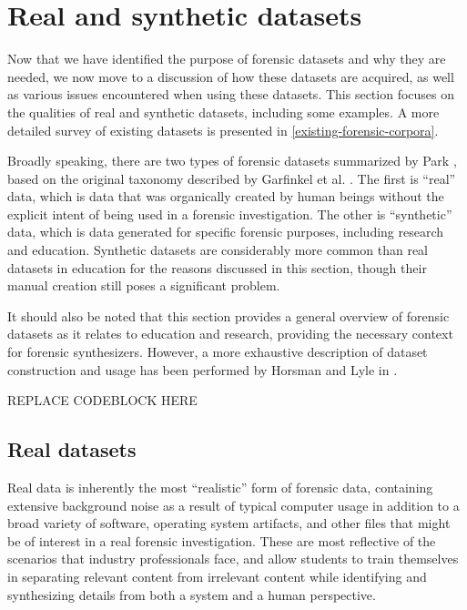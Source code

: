 \documentclass[letterpaper,12pt]{report}
\begin{document}
\section{Real and synthetic
datasets}\label{real-and-synthetic-datasets}

Now that we have identified the purpose of forensic datasets and why
they are needed, we now move to a discussion of how these datasets are
acquired, as well as various issues encountered when using these
datasets. This section focuses on the qualities of real and synthetic
datasets, including some examples. A more detailed survey of existing
datasets is presented in \autoref{existing-forensic-corpora}.

Broadly speaking, there are two types of forensic datasets summarized by
Park \cite{parkTREDEVMPOPCultivating2018}, based on the original
taxonomy described by Garfinkel et al.
\cite{garfinkelBringingScienceDigital2009}. The first is ``real''
data, which is data that was organically created by human beings without
the explicit intent of being used in a forensic investigation. The other
is ``synthetic'' data, which is data generated for specific forensic
purposes, including research and education. Synthetic datasets are
considerably more common than real datasets in education for the reasons
discussed in this section, though their manual creation still poses a
significant problem.

It should also be noted that this section provides a general overview of
forensic datasets as it relates to education and research, providing the
necessary context for forensic synthesizers. However, a more exhaustive
description of dataset construction and usage has been performed by
Horsman and Lyle in \cite{horsmanDatasetConstructionChallenges2021}.

REPLACE CODEBLOCK HERE

\subsection{Real datasets}\label{real-datasets}

Real data is inherently the most ``realistic'' form of forensic data,
containing extensive background noise as a result of typical computer
usage in addition to a broad variety of software, operating system
artifacts, and other files that might be of interest in a real forensic
investigation. These are most reflective of the scenarios that industry
professionals face, and allow students to train themselves in separating
relevant content from irrelevant content while identifying and
synthesizing details from both a system and a human perspective.
\end{document}
